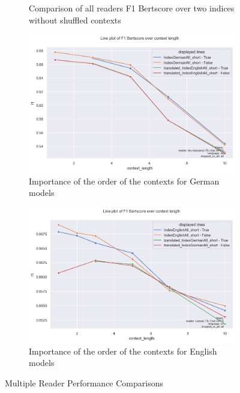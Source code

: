 \begin{figure}
\begin{subfigure}{.5\textwidth}
        \captionsetup{width=.9\linewidth}
        \caption{Comparison of all readers F1 Bertscore over two indices without shuffled contexts}
        \label{fig:reader-all-overview-performance-f1}
    \end{subfigure}
    \begin{subfigure}{.5\textwidth}
        \centering
        \includegraphics[width=\linewidth]{Grafiken/Evaluation/Reader/is_the_order_important_de.png}
        \captionsetup{width=.9\linewidth}
        \caption{Importance of the order of the contexts for German models}
        \label{fig:reader-importance-order-contexts-de}
    \end{subfigure}%
    \begin{subfigure}{.5\textwidth}
        \centering
        \includegraphics[width=\linewidth]{Grafiken/Evaluation/Reader/is_the_order_important_en.png}
        \captionsetup{width=.9\linewidth}
        \caption{Importance of the order of the contexts for English models}
        \label{fig:reader-importance-order-contexts-en}
    \end{subfigure}
    \caption{Multiple Reader Performance Comparisons}
    \label{fig:reader-performance}
\end{figure}

